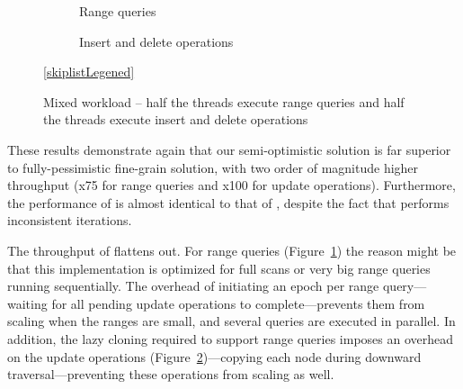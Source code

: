 \begin{figure*}
	\begin{center}
	\begin{subfigure}[t]{.45\textwidth}
		\caption{Range queries} 
		
		\label{evaluation:results:range}
	\end{subfigure}
	\quad\quad\quad
	\begin{subfigure}[t]{.45\textwidth}
		\caption{Insert and delete operations}
		
		\label{evaluation:results:update}
	\end{subfigure}
	\ref{skiplistLegened}
	\end{center}
\caption{Mixed workload -- half the threads execute range queries and half the
threads execute insert and delete operations}
\label{evaluation:results:skiplist}
\end{figure*}

These results demonstrate again that our semi-optimistic
solution is far superior to fully-pessimistic fine-grain solution, with two
order of magnitude higher throughput (x75 for range queries and x100 for
update operations). Furthermore, the performance of \autoSkiplist is almost
identical to that of \skiplist, despite the fact that \skiplist performs
inconsistent iterations.

The throughput of \bronson flattens out. For range queries
(Figure~\ref{evaluation:results:range}) the reason might be that this
implementation is
optimized for full scans or very big range queries running sequentially.
The overhead of initiating an epoch per range query---waiting for all
pending update operations to complete---prevents them from scaling when the
ranges are small, and several queries are executed in parallel. 
In addition, the lazy cloning required to support
range queries imposes an overhead on the update operations
(Figure~\ref{evaluation:results:update})---copying each node during downward
traversal---preventing these operations from scaling as well. 
